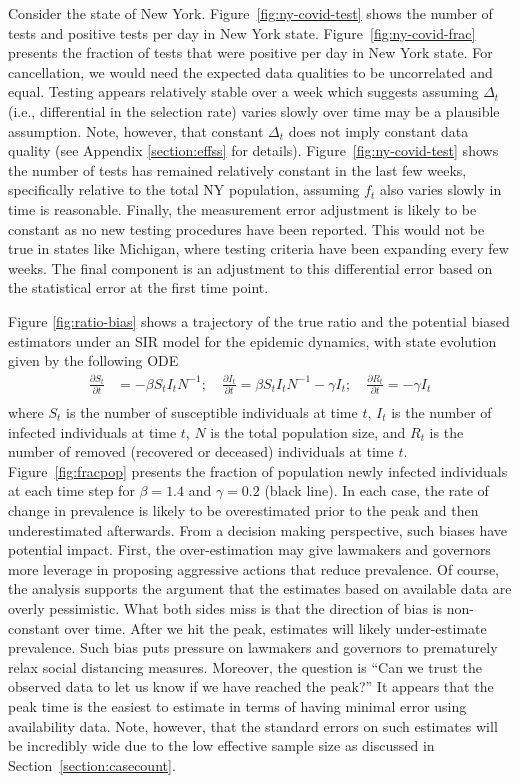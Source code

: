 \documentclass[aoas]{amsart}
\begin{document}
Consider the state of New York.  Figure~\ref{fig:ny-covid-test} shows the number of tests and positive tests per day in New York state.  Figure~\ref{fig:ny-covid-frac} presents the fraction of tests that were positive per day in New York state.  For cancellation, we would need the expected data qualities to be uncorrelated and equal. Testing appears relatively stable over a week which suggests assuming $\Delta_t$ (i.e., differential in the selection rate) varies slowly over time may be a plausible assumption.  Note, however, that constant $\Delta_t$ does not imply constant data quality (see Appendix \ref{section:effss} for details).  Figure~\ref{fig:ny-covid-test} shows the number of tests has remained relatively constant in the last few weeks, specifically relative to the total NY population, assuming $f_t$ also varies slowly in time is reasonable. Finally, the measurement error adjustment is likely to be constant as no new testing procedures have been reported.  This would not be true in states like Michigan, where testing criteria have been expanding every few weeks.  The final component is an adjustment to this differential error based on the statistical error at the first time point.


Figure \ref{fig:ratio-bias} shows a trajectory of the true ratio and the potential biased estimators under an SIR model for the epidemic dynamics, with state evolution given by the following ODE
$$
\begin{aligned}
\frac{\partial S_t}{\partial t} &= - \beta S_t I_t N^{-1}; \quad
\frac{\partial I_t}{\partial t} = \beta S_t I_t N^{-1} - \gamma I_t; \quad
\frac{\partial R_t}{\partial t} = - \gamma I_t \\
\end{aligned}
$$
where $S_t$ is the number of susceptible individuals at time $t$, $I_t$ is the number of infected individuals at time $t$, $N$ is the total population size, and $R_t$ is the number of removed (recovered or deceased) individuals at time $t$.   Figure~\ref{fig:fracpop} presents the fraction of population newly infected individuals at each time step for $\beta = 1.4$ and $\gamma = 0.2$ (black line).  In each case, the rate of change in prevalence is likely to be  overestimated prior to the peak and then underestimated afterwards.  From a decision making perspective, such biases have potential impact.  First, the over-estimation may give lawmakers and governors more leverage in proposing aggressive actions that reduce prevalence.  Of course, the analysis supports the argument that the estimates based on available data are overly pessimistic. What both sides miss is that the direction of bias is non-constant over time.  After we hit the peak, estimates will likely under-estimate prevalence.  Such bias puts pressure on lawmakers and governors to prematurely relax social distancing measures.  Moreover, the question is ``Can we trust the observed data to let us know if we have reached the peak?''  It appears that the peak time is the easiest to estimate in terms of having minimal error using availability data.  Note, however, that the standard errors on such estimates will be incredibly wide due to the low effective sample size as discussed in Section~\ref{section:casecount}.
\end{document}
